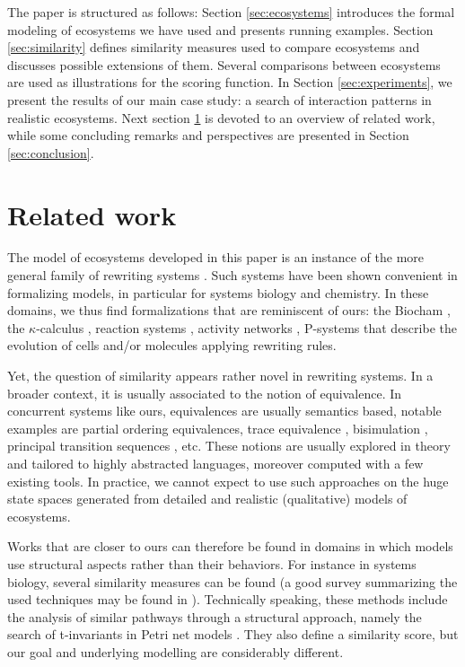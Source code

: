 \documentclass[a4paper,twoside]{article}
\begin{document}
The paper is structured as follows: Section \ref{sec:ecosystems} introduces the formal modeling of ecosystems we have used and presents running examples. Section \ref{sec:similarity} defines similarity measures used to compare ecosystems and discusses possible extensions of them. 
Several comparisons between ecosystems are used as illustrations for the scoring function.
In Section \ref{sec:experiments}, we present the results of our main case study: a search of interaction patterns in realistic ecosystems. 
Next section \ref{sec:related} is devoted to an overview of related work, while some concluding remarks and perspectives are presented in Section \ref{sec:conclusion}.  

\section{Related work}
\label{sec:related}

The model of ecosystems developed in this paper is an instance of the more general family of rewriting systems \cite{Terese03}. 
Such systems have been shown convenient in formalizing models, in particular for systems biology and chemistry. 
In these domains, we thus find formalizations that are reminiscent of ours: the Biocham \cite{Fages:2008:FCB:1786698.1786702}, the $\kappa$-calculus \cite{DBLP:journals/tcs/DanosL04}, reaction systems \cite{reactionsystems}, activity networks 
\cite{toxico2017}, P-systems
\cite{DBLP:journals/ijfcs/PaunPRS11}
that describe the evolution of cells and/or molecules applying rewriting rules.


Yet, the question of similarity appears rather novel in rewriting systems. In a broader context, it is usually associated to the notion of equivalence. In concurrent systems like ours, equivalences are usually semantics based,  notable examples are partial ordering equivalences, trace equivalence \cite{vanglabbek89}, bisimulation \cite{Sangiorgi:2011:IBC:2103603}, principal transition sequences \cite{DBLP:conf/otm/WangHWWHS10}, etc.  
These notions are usually explored in theory and tailored to highly abstracted languages, moreover computed with a few existing tools. 
In practice, we cannot expect to use such approaches on the huge state spaces generated from detailed and realistic (qualitative) models of ecosystems.   

Works that are closer to ours can therefore be found in domains in which models use structural aspects rather than their behaviors. 
For instance in systems biology, several similarity measures can be found (a good survey summarizing the used techniques may be found in \cite{bbw090}).   
Technically speaking, these methods include the analysis of similar pathways through a structural approach, namely the search of t-invariants in Petri net models \cite{Baldan2013ComparingMP, DBLP:journals/topnoc/BaldanCGS13, Grafahrend-Belau2008}.
They also define a similarity score, but our goal and underlying modelling are considerably different.
\end{document}

